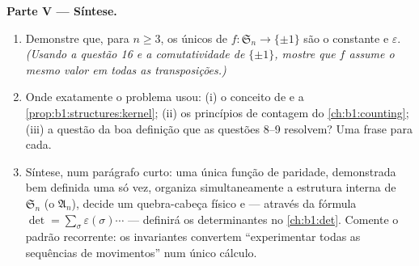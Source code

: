 \begin{problem}
\medskip
\noindent\textbf{Parte V --- Síntese.}
\begin{enumerate}
  \item Demonstre que, para $n \geq 3$, os únicos  de  $f
        \colon \mathfrak S_n \to \{\pm 1\}$ são o  constante
        e $\varepsilon$. \emph{(Usando a questão 16 e a
        comutatividade de $\{\pm1\}$, mostre que $f$ assume o mesmo
        valor em todas as transposições.)}
  \item Onde exatamente o problema usou: (i) o conceito de 
        e a \cref{prop:b1:structures:kernel}; (ii) os princípios de
        contagem do \cref{ch:b1:counting}; (iii) a questão da boa
        definição que as questões 8--9 resolvem? Uma
        frase para cada.
  \item Síntese, num parágrafo curto: uma única função de paridade,
        demonstrada bem definida uma só vez, organiza simultaneamente a
        estrutura interna de $\mathfrak S_n$ (o 
        $\mathfrak A_n$), decide um quebra-cabeça físico e ---
        através da fórmula $\det = \sum_\sigma
        \varepsilon(\sigma)\cdots$ --- definirá os determinantes
        no \cref{ch:b1:det}. Comente o padrão recorrente:
        os invariantes convertem ``experimentar todas as sequências de
        movimentos'' num único cálculo.
\end{enumerate}
\end{problem}
